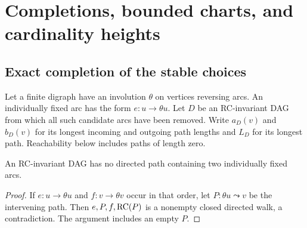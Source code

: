 \section{Completions, bounded charts, and cardinality heights}

\subsection{Exact completion of the stable choices}
\label{sec:stable-completion}
Let a finite digraph have an involution $\theta$ on vertices reversing
arcs. An individually fixed arc has the form $e:u\to\theta u$.
Let $D$ be an RC-invariant DAG from which all such candidate arcs
have been removed. Write $a_D(v)$ and $b_D(v)$ for its longest
incoming and outgoing path lengths and $L_D$ for its longest path.
Reachability below includes paths of length zero.

\begin{lemma}
\label{lem:one-fixed-arc}
An RC-invariant DAG has no directed path containing two
individually fixed arcs.
\end{lemma}
\begin{proof}
If $e:u\to\theta u$ and $f:v\to\theta v$ occur in that order,
let $P\colon\theta u\leadsto v$ be the intervening path. Then
$e,P,f,\operatorname{RC}(P)$ is a nonempty closed directed walk, a contradiction.
The argument includes an empty $P$.
\end{proof}

